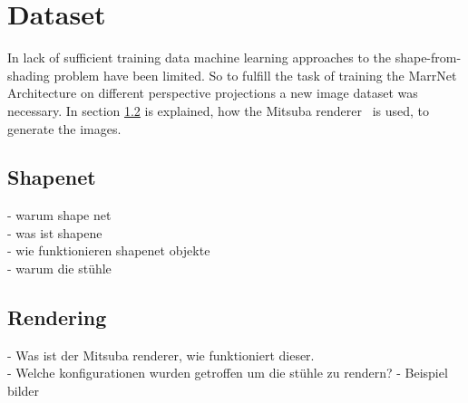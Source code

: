 \chapter{Dataset}
\label{sec:dataset}
 	In lack of sufficient training data machine learning approaches to the shape-from-shading problem have been limited. So to fulfill the task of training the MarrNet Architecture 
 	on different perspective projections a new image dataset was necessary. In section \ref{sec:dataset:rendering} is explained, how the Mitsuba renderer~\cite{Mitsuba} is used, to generate the images. 
 	

\section{Shapenet}
\label{sec:dataset:shapenet}
	- warum shape net \\
	- was ist shapene \\
	- wie funktionieren shapenet objekte \\
	- warum die stühle


\section{Rendering}
\label{sec:dataset:rendering}
	- Was ist der Mitsuba renderer, wie funktioniert dieser. \\
	- Welche konfigurationen wurden getroffen um die stühle zu rendern? 
	- Beispiel bilder



	

